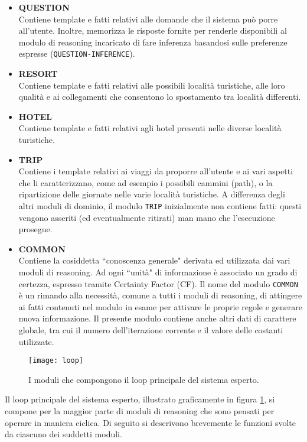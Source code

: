 \begin{itemize}
\item \textbf{QUESTION}\\
Contiene template e fatti relativi alle domande che il sistema può porre all'utente. Inoltre, memorizza le risposte fornite per renderle disponibili al modulo di reasoning incaricato di fare inferenza basandosi sulle preferenze espresse (\texttt{QUESTION-INFERENCE}).
\item \textbf{RESORT}\\
Contiene template e fatti relativi alle possibili località turistiche, alle loro qualità e ai collegamenti che consentono lo spostamento tra località differenti.
\item \textbf{HOTEL}\\
Contiene template e fatti relativi agli hotel presenti nelle diverse località turistiche.
\item \textbf{TRIP}\\
Contiene i template relativi ai viaggi da proporre all'utente e ai vari aspetti che li caratterizzano, come ad esempio i possibili cammini (path), o la ripartizione delle giornate nelle varie località turistiche. A differenza degli altri moduli di dominio, il modulo \texttt{TRIP} inizialmente non contiene fatti: questi vengono asseriti (ed eventualmente ritirati) man mano che l'esecuzione prosegue.
\item \textbf{COMMON}\\
Contiene la cosiddetta ``conoscenza generale" derivata ed utilizzata dai vari moduli di reasoning. Ad ogni ``unità" di informazione è associato un grado di certezza, espresso tramite Certainty Factor (CF). Il nome del modulo \texttt{COMMON} è un rimando alla necessità, comune a tutti i moduli di reasoning, di attingere ai fatti contenuti nel modulo in esame per attivare le proprie regole e generare nuova informazione. Il presente modulo contiene anche altri dati di carattere globale, tra cui il numero dell'iterazione corrente e il valore delle costanti utilizzate.
\end{itemize}


\begin{figure}[h]
  \centering
  \texttt{[image: loop]}
  \caption{I moduli che compongono il loop principale del sistema esperto.}
  \label{loop}
\end{figure}

Il loop principale del sistema esperto, illustrato graficamente in figura \ref{loop}, si compone per la maggior parte di moduli di reasoning che sono pensati per operare in maniera ciclica. Di seguito si descrivono brevemente le funzioni svolte da ciascuno dei suddetti moduli.

